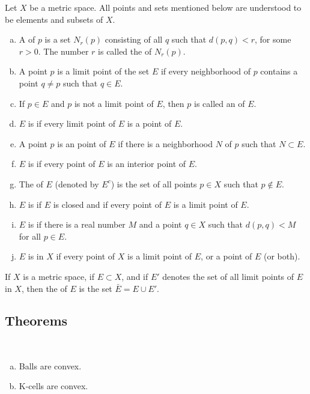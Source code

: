 \begin{deff}
	Let $X$ be a metric space. All points and sets mentioned below are understood to be elements and subsets of $X$.
	\begin{enumerate}[(a)]
		\item A {} of $p$ is a set $N_r(p)$ consisting of all $q$ such that $d(p,q) < r$, for some $r > 0$. The number $r$ is called the {} of $N_r(p)$.
		\item A point $p$ is a limit point of the set $E$ if every neighborhood of $p$ contains a point $q \ne p$ such that $q \in E$.
		\item If $p \in E$ and $p$ is not a limit point of $E$, then $p$ is called an {}  of $E$.
		\item $E$ is {} if every limit point of $E$ is a point of $E$.
		\item A point $p$ is an {} point of $E$ if there is a neighborhood $N$ of $p$ such that $N \subset E$.
		\item $E$ is {} if every point of $E$ is an interior point of $E$.
		\item The {} of $E$ (denoted by $E^c$) is the set of all points $p \in X$ such that $p \notin E$.
		\item $E$ is {} if $E$ is closed and if every point of $E$ is a limit point of $E$.
		\item $E$ is {} if there is a real number $M$ and a point $q \in X$ such that $d(p,q) < M$ for all $p \in E$.
		\item $E$ is {} in $X$ if every point of $X$ is a limit point of $E$, or a point of $E$ (or both).
	\end{enumerate}
\end{deff}

\begin{deff}
If $X$ is a metric space, if $E \subset X$, and if $E'$ denotes the set of all limit points of $E$ in $X$, then the {} of $E$ is the set $\bar E = E \cup E'$.
\end{deff}

\subsection{Theorems}
\begin{thm}
	~
	\begin{enumerate}[(a)]
	\item Balls are convex.
	\item K-cells are convex.
	\end{enumerate}
\end{thm}

